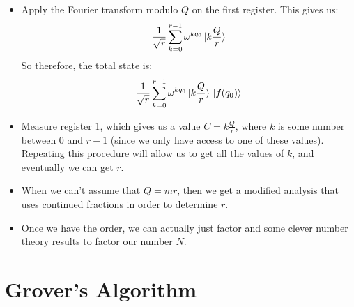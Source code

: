 \documentclass[10pt]{article}
\begin{document}
\begin{itemize}
		\item Apply the Fourier transform modulo \( Q \) on the first register. This gives us:
			\[
				\frac{1}{\sqrt{r} }\sum_{k=0}^{r-1} \omega^{k q_0}\ket*{k \frac{Q}{r}}
			\] 
			So therefore, the total state is:
			\[
				\frac{1}{\sqrt{r} }\sum_{k=0}^{r-1} \omega^{k q_0}\ket*{k \frac{Q}{r}} \ket*{f(q_0)}
			\] 
		\item Measure register 1, which gives us a value \( C = k \frac{Q}{r} \), where \( k \) is some number 
			between \( 0 \) and \( r - 1 \) (since we only have access to one of these values). Repeating this procedure
			will allow us to get all the values of \( k \), and eventually we can get \( r \). 
		\item When we can't assume that \( Q = mr \), then we get a modified analysis that uses continued fractions 
			in order to determine \( r \). 
		\item Once we have the order, we can actually just factor and some clever number theory results to 
			factor our number \( N \). 
	\end{itemize}
	\section{Grover's Algorithm}
\end{document}
